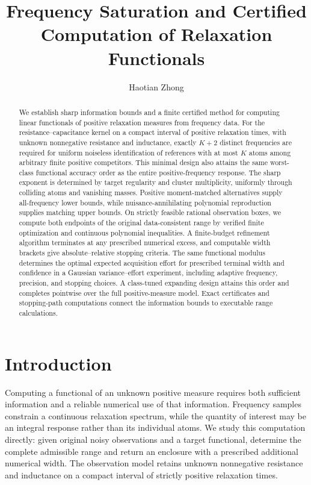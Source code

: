 \documentclass[10pt]{amsart}
\title[Frequency saturation and certified computation]{Frequency Saturation and Certified Computation of Relaxation Functionals}
\author{Haotian Zhong}
\date{}
\theoremstyle{definition}
\theoremstyle{remark}
\begin{document}
\begin{abstract}
We establish sharp information bounds and a finite certified method for computing linear functionals of positive relaxation measures from frequency data. For the resistance--capacitance kernel on a compact interval of positive relaxation times, with unknown nonnegative resistance and inductance, exactly $K+2$ distinct frequencies are required for uniform noiseless identification of references with at most $K$ atoms among arbitrary finite positive competitors. This minimal design also attains the same worst-class functional accuracy order as the entire positive-frequency response. The sharp exponent is determined by target regularity and cluster multiplicity, uniformly through colliding atoms and vanishing masses. Positive moment-matched alternatives supply all-frequency lower bounds, while nuisance-annihilating polynomial reproduction supplies matching upper bounds. On strictly feasible rational observation boxes, we compute both endpoints of the original data-consistent range by verified finite optimization and continuous polynomial inequalities. A finite-budget refinement algorithm terminates at any prescribed numerical excess, and computable width brackets give absolute--relative stopping criteria. The same functional modulus determines the optimal expected acquisition effort for prescribed terminal width and confidence in a Gaussian variance--effort experiment, including adaptive frequency, precision, and stopping choices. A class-tuned expanding design attains this order and completes pointwise over the full positive-measure model. Exact certificates and stopping-path computations connect the information bounds to executable range calculations.
\end{abstract}
\maketitle

\section{Introduction}\label{sec:intro}
Computing a functional of an unknown positive measure requires both sufficient information and a reliable numerical use of that information. Frequency samples constrain a continuous relaxation spectrum, while the quantity of interest may be an integral response rather than its individual atoms. We study this computation directly: given original noisy observations and a target functional, determine the complete admissible range and return an enclosure with a prescribed additional numerical width. The observation model retains unknown nonnegative resistance and inductance on a compact interval of strictly positive relaxation times.
\end{document}
